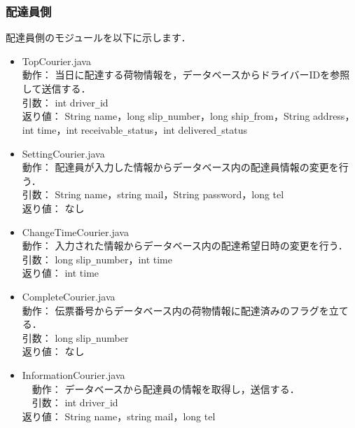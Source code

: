 \documentclass[a4j,titlepage]{jarticle}
\begin{document}
\subsubsection{配達員側}
配達員側のモジュールを以下に示します．
\begin{itemize}
\item TopCourier.java\\
  動作： 当日に配達する荷物情報を，データベースからドライバーIDを参照して送信する．\\
  引数： int driver\verb|_|id\\
  返り値： String name，long slip\verb|_|number，long ship\verb|_|from，String address，int time，int receivable\verb|_|status，int delivered\verb|_|status
\item SettingCourier.java\\
  動作： 配達員が入力した情報からデータベース内の配達員情報の変更を行う．\\
  引数： String name，string mail，String password，long tel\\
  返り値： なし
\item ChangeTimeCourier.java\\
  動作： 入力された情報からデータベース内の配達希望日時の変更を行う．\\
  引数： long slip\verb|_|number，int time\\
  返り値： int time
\item CompleteCourier.java\\
  動作： 伝票番号からデータベース内の荷物情報に配達済みのフラグを立てる．\\
  引数： long slip\verb|_|number\\
  返り値： なし
\item  InformationCourier.java\\
　動作： データベースから配達員の情報を取得し，送信する．\\
　引数： int driver\verb|_|id\\
返り値： String name，string mail，long tel
\end{itemize}
\end{document}
